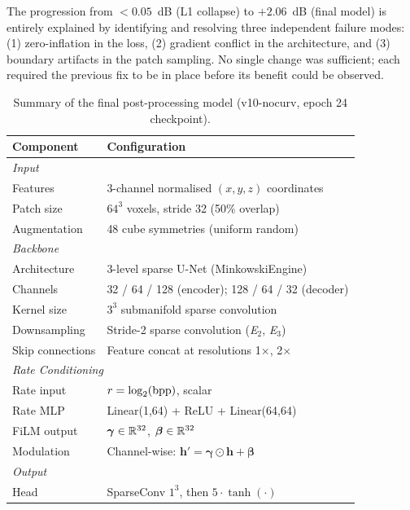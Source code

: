 The progression from $< 0.05$~dB (L1 collapse) to $+2.06$~dB (final model)
is entirely explained by identifying and resolving three independent failure
modes: (1) zero-inflation in the loss, (2) gradient conflict in the architecture,
and (3) boundary artifacts in the patch sampling.
No single change was sufficient; each required the previous fix to be in place
before its benefit could be observed.

\begin{table}[t]
  \centering
  \caption{%
    Summary of the final post-processing model (v10-nocurv, epoch 24 checkpoint).
  }
  \label{tab:model-summary}
  \small
  \begin{tabular}{ll}
    \toprule
    \textbf{Component} & \textbf{Configuration} \\
    \midrule
    \multicolumn{2}{l}{\textit{Input}} \\
    Features & 3-channel normalised $(x, y, z)$ coordinates \\
    Patch size & $64^3$ voxels, stride 32 (50\% overlap) \\
    Augmentation & 48 cube symmetries (uniform random) \\
    \midrule
    \multicolumn{2}{l}{\textit{Backbone}} \\
    Architecture & 3-level sparse U-Net (MinkowskiEngine) \\
    Channels & 32 / 64 / 128 (encoder); 128 / 64 / 32 (decoder) \\
    Kernel size & $3^3$ submanifold sparse convolution \\
    Downsampling & Stride-2 sparse convolution (\textit{E}$_2$, \textit{E}$_3$) \\
    Skip connections & Feature concat at resolutions 1$\times$, 2$\times$ \\
    \midrule
    \multicolumn{2}{l}{\textit{Rate Conditioning}} \\
    Rate input & $r = \log_2(\mathrm{bpp})$, scalar \\
    Rate MLP & Linear(1,64) + ReLU + Linear(64,64) \\
    FiLM output & $\boldsymbol{\gamma} \in \mathbb{R}^{32}$, $\boldsymbol{\beta} \in \mathbb{R}^{32}$ \\
    Modulation & Channel-wise: $\mathbf{h}' = \boldsymbol{\gamma} \odot \mathbf{h} + \boldsymbol{\beta}$ \\
    \midrule
    \multicolumn{2}{l}{\textit{Output}} \\
    Head & SparseConv $1^3$, then $5 \cdot \tanh(\cdot)$ \\

\end{tabular}
\end{table}
